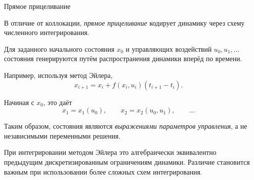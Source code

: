 \documentclass{beamer}
\begin{document}
	\begin{frame}{Прямое прицеливание}
		\begin{flushleft}
			
			{\small 
				В отличие от коллокации, \emph{прямое прицеливание} кодирует
				динамику через схему численного интегрирования.
				
				\vspace{0.5em}
				
				Для заданного начального состояния $x_0$ и управляющих воздействий
				$u_0,u_1,\ldots$ состояния генерируются путём распространения
				динамики вперёд по времени.
				
				\vspace{0.5em}
				
				Например, используя метод Эйлера,
				\[
				x_{i+1}
				=
				x_i
				+
				f(x_i,u_i)
				(t_{i+1}-t_i).
				\]
				
				Начиная с $x_0$, это даёт
				\[
				x_1=x_1(u_0),
				\qquad
				x_2=x_2(u_0,u_1),
				\qquad\ldots
				\]
				
				Таким образом, состояния являются \emph{выражениями параметров
					управления}, а не независимыми переменными решения.
				
				\vspace{0.5em}
				
				При интегрировании методом Эйлера это алгебраически эквивалентно
				предыдущим дискретизированным ограничениям динамики. Различие становится важным при использовании более сложных
				схем интегрирования.
			}
		\end{flushleft}
	\end{frame}
	
\end{document}
